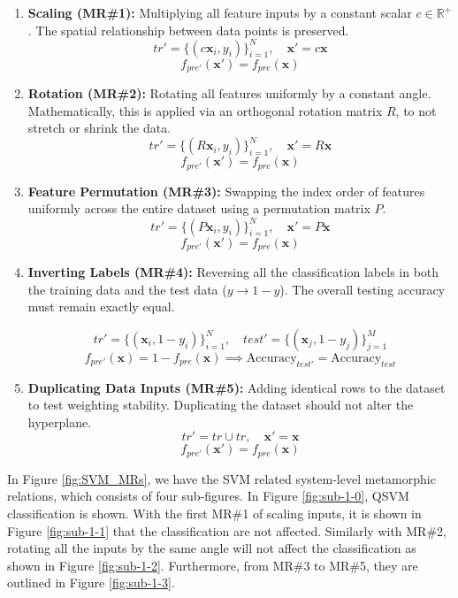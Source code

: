 \documentclass[12pt,a4paper]{article}
\begin{document}
		\begin{enumerate}
			\item \textbf{Scaling (MR\#1):} Multiplying all feature inputs by a constant scalar $c \in \mathbb{R}^+$. The spatial relationship between data points is preserved.
			$$ tr' = \{(c\mathbf{x}_i, y_i)\}_{i=1}^N, \quad \mathbf{x}' = c\mathbf{x} $$
			$$ f_{pre'}(\mathbf{x}') = f_{pre}(\mathbf{x}) $$
			
		\item \textbf{Rotation (MR\#2):} Rotating all features uniformly by a constant angle. Mathematically, this is applied via an orthogonal rotation matrix $R$, to not stretch or shrink the data.
		$$ tr' = \{(R\mathbf{x}_i, y_i)\}_{i=1}^N, \quad \mathbf{x}' = R\mathbf{x} $$
		$$ f_{pre'}(\mathbf{x}') = f_{pre}(\mathbf{x}) $$
			
			\item \textbf{Feature Permutation (MR\#3):} Swapping the index order of features uniformly across the entire dataset using a permutation matrix $P$.
			$$ tr' = \{(P\mathbf{x}_i, y_i)\}_{i=1}^N, \quad \mathbf{x}' = P\mathbf{x} $$
			$$ f_{pre'}(\mathbf{x}') = f_{pre}(\mathbf{x}) $$
			
		\item \textbf{Inverting Labels (MR\#4):} Reversing all the classification labels in both the training data and the test data ($y \to 1 - y$). The overall testing accuracy must remain exactly equal.
		
		$$ tr' = \{(\mathbf{x}_i, 1 - y_i)\}_{i=1}^N, \quad test' = \{(\mathbf{x}_j, 1 - y_j)\}_{j=1}^M $$
		$$ f_{pre'}(\mathbf{x}) = 1 - f_{pre}(\mathbf{x}) \implies \text{Accuracy}_{test'} = \text{Accuracy}_{test} $$
			
			\item \textbf{Duplicating Data Inputs (MR\#5):} Adding identical rows to the dataset to test weighting stability. Duplicating the dataset should not alter the hyperplane.
			$$ tr' = tr \cup tr, \quad \mathbf{x}' = \mathbf{x} $$
			$$ f_{pre'}(\mathbf{x}') = f_{pre}(\mathbf{x}) $$
		\end{enumerate}
		
	In Figure \ref{fig:SVM_MRs}, we have the SVM related system-level metamorphic relations, which consists of four sub-figures. In Figure \ref{fig:sub-1-0}, QSVM classification is shown. With the first MR\#1 of scaling inputs, it is shown in Figure \ref{fig:sub-1-1} that the classification are not affected. Similarly with MR\#2, rotating all the inputs by the same angle will not affect the classification as shown in Figure \ref{fig:sub-1-2}. Furthermore, from MR\#3 to MR\#5, they are outlined in Figure \ref{fig:sub-1-3}.
	
\end{document}
